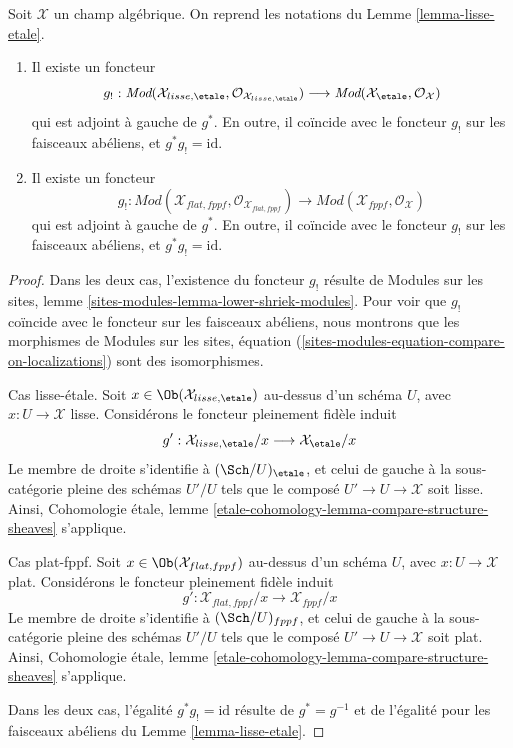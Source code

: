 \begin{lemma}
\label{lemma-lisse-etale-modules}
Soit $\mathcal{X}$ un champ algébrique. On reprend les notations du
Lemme \ref{lemma-lisse-etale}.
\begin{enumerate}
\item Il existe un foncteur
$$
g_! :
\textit{Mod}(\mathcal{X}_{lisse,\etale},
\mathcal{O}_{\mathcal{X}_{lisse,\etale}})
\longrightarrow
\textit{Mod}(\mathcal{X}_\etale, \mathcal{O}_{\mathcal{X}})
$$
qui est adjoint à gauche de $g^*$. En outre, il coïncide avec le foncteur $g_!$
sur les faisceaux abéliens, et $g^*g_! = \text{id}$.
\item Il existe un foncteur
$$
g_! :
\textit{Mod}(\mathcal{X}_{flat,fppf},
\mathcal{O}_{\mathcal{X}_{flat,fppf}})
\longrightarrow
\textit{Mod}(\mathcal{X}_{fppf}, \mathcal{O}_{\mathcal{X}})
$$
qui est adjoint à gauche de $g^*$. En outre, il coïncide avec le foncteur $g_!$
sur les faisceaux abéliens, et $g^*g_! = \text{id}$.
\end{enumerate}
\end{lemma}

\begin{proof}
Dans les deux cas, l'existence du foncteur $g_!$ résulte de
Modules sur les sites, lemme \ref{sites-modules-lemma-lower-shriek-modules}.
Pour voir que $g_!$ coïncide avec le foncteur sur les faisceaux abéliens, nous
montrons que les morphismes de Modules sur les sites, équation
(\ref{sites-modules-equation-compare-on-localizations})
sont des isomorphismes.

\medskip\noindent
Cas lisse-étale. Soit $x \in \Ob(\mathcal{X}_{lisse,\etale})$
au-dessus d'un schéma $U$, avec $x : U \to \mathcal{X}$ lisse.
Considérons le foncteur pleinement fidèle induit
$$
g' :
\mathcal{X}_{lisse,\etale}/x
\longrightarrow
\mathcal{X}_\etale/x
$$
Le membre de droite s'identifie à $(\Sch/U)_\etale$, et celui de
gauche à la sous-catégorie pleine des schémas $U'/U$ tels que
le composé $U' \to U \to \mathcal{X}$ soit lisse. Ainsi,
Cohomologie étale, lemme
\ref{etale-cohomology-lemma-compare-structure-sheaves}
s'applique.

\medskip\noindent
Cas plat-fppf. Soit $x \in \Ob(\mathcal{X}_{flat,fppf})$
au-dessus d'un schéma $U$, avec $x : U \to \mathcal{X}$ plat.
Considérons le foncteur pleinement fidèle induit
$$
g' :
\mathcal{X}_{flat,fppf}/x
\longrightarrow
\mathcal{X}_{fppf}/x
$$
Le membre de droite s'identifie à $(\Sch/U)_{fppf}$, et celui de
gauche à la sous-catégorie pleine des schémas $U'/U$ tels que
le composé $U' \to U \to \mathcal{X}$ soit plat. Ainsi,
Cohomologie étale, lemme
\ref{etale-cohomology-lemma-compare-structure-sheaves}
s'applique.

\medskip\noindent
Dans les deux cas, l'égalité $g^*g_! = \text{id}$ résulte de
$g^* = g^{-1}$ et de
l'égalité pour les faisceaux abéliens du Lemme \ref{lemma-lisse-etale}.
\end{proof}

